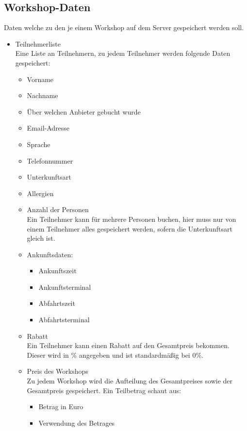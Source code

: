 \subsection{Workshop-Daten}\label{workshop:dat}
Daten welche zu den je einem Workshop auf dem Server gespeichert werden soll.
\begin{itemize}[leftmargin=1.0in]
    \item [\ld] Teilnehmerliste\\
    Eine Liste an Teilnehmern, zu jedem Teilnehmer werden folgende Daten gespeichert:
    \begin{itemize}
        \item Vorname
        \item Nachname
        \item Über welchen Anbieter gebucht wurde
        \item Email-Adresse
        \item Sprache
        \item Telefonnummer
        \item Unterkunftsart
        \item Allergien
        \item Anzahl der Personen\\
            Ein Teilnehmer kann für mehrere Personen buchen, hier muss nur von einem Teilnehmer alles gespeichert werden, sofern die Unterkunftsart gleich ist. 
        \item Ankunftsdaten:
        \begin{itemize}
            \item Ankunftszeit
            \item Ankunftsterminal
            \item Abfahrtszeit
            \item Abfahrtsterminal
        \end{itemize}
        \item Rabatt\\
            Ein Teilnehmer kann einen Rabatt auf den Gesamtpreis bekommen. Dieser wird in \% angegeben und ist standardmäßig bei 0\%.
        \item Preis des Workshops\\
            Zu jedem Workshop wird die Aufteilung des Gesamtpreises sowie der Gesamtpreis gespeichert. Ein Teilbetrag schaut aus:
            \begin{itemize}
                \item Betrag in Euro
                \item Verwendung des Betrages

\end{itemize}
\end{itemize}
\end{itemize}
